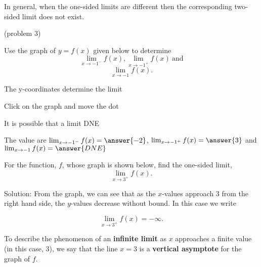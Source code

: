 \documentclass[handout]{ximera}
\begin{document}
In general, when the one-sided limits are different then the 
corresponding two-sided limit does not exist.

\begin{problem}(problem 3)


  Use the graph of $y = f(x)$ given below to determine
  \[
  \lim_{x\to -1^-} f(x), \lim_{x\to -1^+} f(x) \ \text{and}
	\]
	\[
	\lim_{x\to -1} f(x).
	\]
  
  
    \begin{hint}
      The y-coordinates determine the limit
    \end{hint}
		\begin{hint}
		  Click on the graph and move the dot
		\end{hint}
		\begin{hint}
		  It is possible that a limit DNE
		\end{hint}
		The value are $\lim_{x\to -1^-} f(x)=\answer{-2}$, 
		$\lim_{x\to -1^+} f(x)=\answer{3}$ and 
		$\lim_{x\to -1} f(x)=\answer{DNE}$



	
\end{problem}


\begin{example}[example 4]
For the function, $f$, whose graph is shown below, find the one-sided limit,
\[
\lim_{x \to 3^+}f(x).
\]




\vspace{.25in}
Solution: From the graph, we can see that as the $x$-values approach 3 from the right hand side, the $y$-values decrease without bound.  In this case we write

\[
\lim_{x \to 3^+}f(x) = -\infty.
\]

To describe the phenomenon of an \textbf{infinite limit} as $x$ approaches a finite value (in this case, 3), 
we say that the line $x = 3$ is a \textbf{vertical asymptote} for the graph of $f$.

\end{example}
\end{document}
